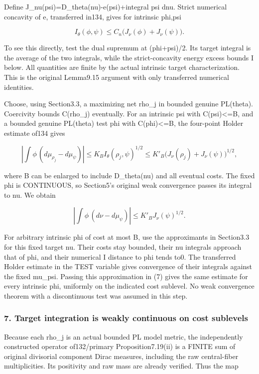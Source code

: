 \documentclass[
]{article}
\begin{document}
Define J\_nu(psi)=D\_theta(nu)-e(psi)+integral psi dnu. Strict numerical
concavity of e, transferred in134, gives for intrinsic phi,psi

\[I_\theta(\phi,\psi)\leq C_n\bigl(J_\nu(\phi)+J_\nu(\psi)\bigr).\tag{6}\]

To see this directly, test the dual supremum at (phi+psi)/2. Its target
integral is the average of the two integrals, while the strict-concavity
energy excess bounds I below. All quantities are finite by the actual
intrinsic target characterization. This is the original Lemma9.15
argument with only transferred numerical identities.

Choose, using Section3.3, a maximizing net rho\_j in bounded genuine
PL(theta). Coercivity bounds C(rho\_j) eventually. For an intrinsic psi
with C(psi)\textless=B, and a bounded genuine PL(theta) test phi with
C(phi)\textless=B, the four-point Holder estimate of134 gives

\[\left|\int\phi\,(d\mu_{\rho_j}-d\mu_\psi)\right|
\leq K_B I_\theta(\rho_j,\psi)^{1/2}
\leq K'_B\bigl(J_\nu(\rho_j)+J_\nu(\psi)\bigr)^{1/2},\]

where B can be enlarged to include D\_theta(nu) and all eventual costs.
The fixed phi is CONTINUOUS, so Section5's original weak convergence
passes its integral to nu. We obtain

\[\left|\int\phi\,(d\nu-d\mu_\psi)\right|
\leq K'_B J_\nu(\psi)^{1/2}.\tag{7}\]

For arbitrary intrinsic phi of cost at most B, use the approximants in
Section3.3 for this fixed target nu. Their costs stay bounded, their nu
integrals approach that of phi, and their numerical I distance to phi
tends to0. The transferred Holder estimate in the TEST variable gives
convergence of their integrals against the fixed mu\_psi. Passing this
approximation in (7) gives the same estimate for every intrinsic phi,
uniformly on the indicated cost sublevel. No weak convergence theorem
with a discontinuous test was assumed in this step.

\subsubsection{7. Target integration is weakly continuous on cost
sublevels}\label{target-integration-is-weakly-continuous-on-cost-sublevels}

Because each rho\_j is an actual bounded PL model metric, the
independently constructed operator of132/primary Proposition7.19(ii) is
a FINITE sum of original divisorial component Dirac measures, including
the raw central-fiber multiplicities. Its positivity and raw mass are
already verified. Thus the map
\end{document}
